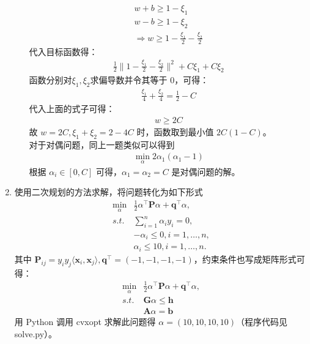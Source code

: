 \documentclass[11pt,letter,notitlepage]{article}
\begin{document}
\begin{solution}
\begin{enumerate}
\begin{enumerate}
			\begin{align*}
				w + b \geqslant 1 - \xi_1\\
				w - b \geqslant 1 - \xi_2\\
				\Rightarrow w \geqslant 1 - \frac{\xi_1}{2} - \frac{\xi_2}{2}
			\end{align*}
			代入目标函数得：
			\begin{align*}
				\frac{1}{2}\| 1-\frac{\xi_1}{2}-\frac{\xi_2}{2} \|^2 +C\xi_1 + C\xi_2
			\end{align*}
			函数分别对$\xi_1, \xi_2$求偏导数并令其等于 0，可得：
			\begin{align*}
				\frac{\xi_1}{4} + \frac{\xi_2}{4} = \frac{ 1 }{ 2} - C
			\end{align*}
			代入上面的式子可得：
			\begin{align*}
				w \geqslant 2C
			\end{align*}
			故 $w = 2C, \xi_1 + \xi_2 = 2-4C$ 时，函数取到最小值 $2C(1-C)$。\\
			对于对偶问题，同上一题类似可以得到
			\begin{align*}
				\min_{\alpha} 2\alpha_1(\alpha_1 - 1)
			\end{align*}
			根据 $\alpha_i \in [0, C]$ 可得，$\alpha_1 = \alpha_2 = C$ 是对偶问题的解。
		\end{enumerate}
		\item 使用二次规划的方法求解，将问题转化为如下形式
		\begin{align*}
			\min_{\alpha} &\frac{1}{2} \alpha^{\top}\mathbf{P}\alpha + \mathbf{q}^{\top}\alpha,\\
			s.t. &\sum\limits_{i=1}^n \alpha_iy_i = 0,\\
			&-\alpha_i \leqslant 0, i= 1,\dots, n,\\
			&\alpha_i \leqslant 10, i= 1,\dots, n.
		\end{align*}
		其中 $\mathbf{P}_{ij} = y_iy_j\langle\mathbf{x}_i,\mathbf{x}_j\rangle, \mathbf{q}^{\top} = (-1, -1, -1, -1)$，约束条件也写成矩阵形式可得：
		\begin{align*}
			\min_{\alpha} &\frac{1}{2} \alpha^{\top}\mathbf{P}\alpha + \mathbf{q}^{\top}\alpha,\\
			s.t. &\mathbf{G}\alpha \leqslant \mathbf{h}\\
			&\mathbf{A}\alpha = \mathbf{b}
		\end{align*}
		用 Python 调用 cvxopt 求解此问题得 $\alpha = (10, 10, 10, 10)$（程序代码见 solve.py）。
	\end{enumerate}
\end{solution}

\end{document}
